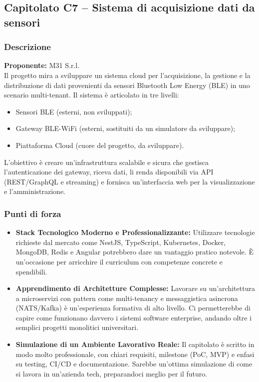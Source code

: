 \documentclass{article}
\begin{document}
	\subsection{Capitolato C7 – Sistema di acquisizione dati da sensori}
	\subsubsection{Descrizione}
    \textbf{Proponente:} M31 S.r.l.\\
	Il progetto mira a sviluppare un sistema cloud per l'acquisizione, la gestione e la distribuzione di dati provenienti da sensori Bluetooth Low Energy (BLE) in uno scenario multi-tenant. Il sistema è articolato in tre livelli:
    \vspace{-0.3em}
    \begin{itemize}
        \setlength\itemsep{-0.1em}
        \item Sensori BLE (esterni, non sviluppati);
        \item Gateway BLE-WiFi (esterni, sostituiti da un simulatore da sviluppare);
        \item Piattaforma Cloud (cuore del progetto, da sviluppare).
    \end{itemize}
    \vspace{-0.3em}
    L'obiettivo è creare un'infrastruttura scalabile e sicura che gestisca l'autenticazione dei gateway, riceva dati, li renda disponibili via API (REST/GraphQL e streaming) e fornisca un'interfaccia web per la visualizzazione e l'amministrazione.

	
	\subsubsection{Punti di forza}
	\begin{itemize}
		\item \textbf{Stack Tecnologico Moderno e Professionalizzante:} Utilizzare tecnologie richieste dal mercato come NestJS, TypeScript, Kubernetes, Docker, MongoDB, Redis e Angular potrebbero dare un vantaggio pratico notevole. È un'occasione per arricchire il curriculum con competenze concrete e spendibili.
		\item \textbf{Apprendimento di Architetture Complesse:} Lavorare su un'architettura a microservizi con pattern come multi-tenancy e messaggistica asincrona (NATS/Kafka) è un'esperienza formativa di alto livello. Ci permetterebbe di capire come funzionano davvero i sistemi software enterprise, andando oltre i semplici progetti monolitici universitari.
		\item \textbf{Simulazione di un Ambiente Lavorativo Reale:}  Il capitolato è scritto in modo molto professionale, con chiari requisiti, milestone (PoC, MVP) e enfasi su testing, CI/CD e documentazione. Sarebbe un'ottima simulazione di come si lavora in un'azienda tech, preparandoci meglio per il futuro.
    \end{itemize}
	
\end{document}
